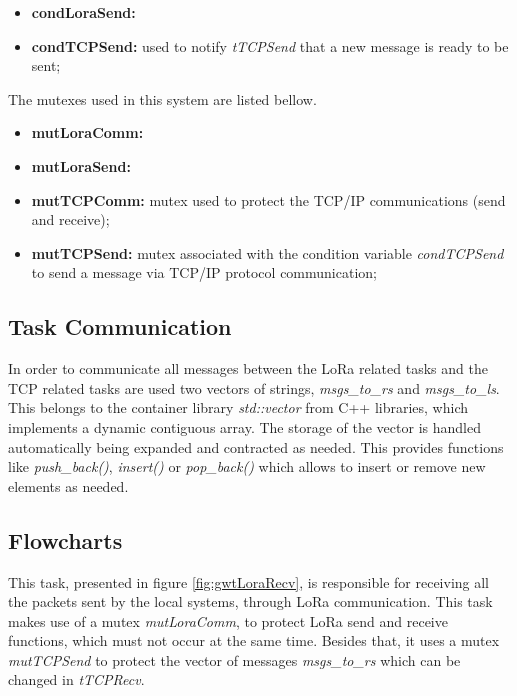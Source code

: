 \begin{itemize}
	\item \textbf{condLoraSend:}
	
	\item \textbf{condTCPSend:} used to notify \textit{tTCPSend} that a new message is ready to be sent;
		
\end{itemize}

The mutexes used in this system are listed bellow.

\begin{itemize}
	\item \textbf{mutLoraComm:}
	\item \textbf{mutLoraSend:}	
	
	\item \textbf{mutTCPComm:} mutex used to protect the TCP/IP communications (send and receive);
	\item \textbf{mutTCPSend:} mutex associated with the condition variable \textit{condTCPSend} to send a message via TCP/IP protocol communication;
\end{itemize}


\subsection{Task Communication}
In order to communicate all messages between the LoRa related tasks and the TCP related tasks are used two vectors of strings, \textit{msgs\_to\_rs} and \textit{msgs\_to\_ls}. This belongs to the container library \textit{std::vector} from C++ libraries, which implements a dynamic contiguous array. The storage of the vector is handled automatically being expanded and contracted as needed. This provides functions like \textit{push\_back()}, \textit{insert()} or \textit{pop\_back()} which allows to insert or remove new elements as needed.

\subsection{Flowcharts}
This task, presented in figure \ref{fig:gwtLoraRecv}, is responsible for receiving all the packets sent by the local systems, through LoRa communication. This task makes use of a mutex \textit{mutLoraComm}, to protect LoRa send and receive functions, which must not occur at the same time. Besides that, it uses a mutex \textit{mutTCPSend} to protect the vector of messages \textit{msgs\_to\_rs} which can be changed in \textit{tTCPRecv}.

